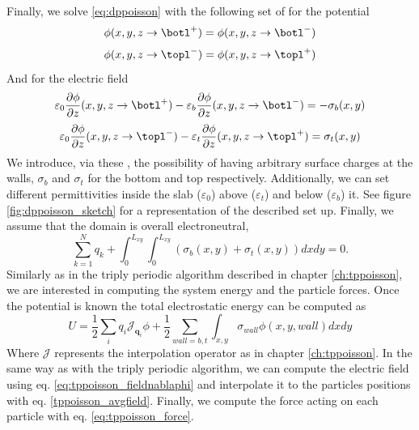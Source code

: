 \documentclass[ twoside,openright,titlepage,numbers=noenddot,%
headinclude,footinclude,cleardoublepage=empty,abstract=on,
BCOR=5mm,paper=a4,fontsize=11pt, dvipsnames
]{scrreprt}
\renewcommand{\vec}[1]{\bm{#1}}
\newcommand{\oper}[1]{\mathcal{#1}}
\begin{document}
Finally, we solve \eqref{eq:dppoisson} with the following set of \bcs for the potential
\begin{equation}\phi(x,y,z\rightarrow \botl^+)=\phi(x,y,z\rightarrow \botl^-)\label{eq:dppoissonbcs1}\end{equation}  
\begin{equation}\phi(x,y,z\rightarrow \topl^-)=\phi(x,y,z\rightarrow \topl^+)\label{eq:dppoissonbcs2}\end{equation}
And for the electric field 
\begin{equation}\varepsilon_0 \frac{\partial \phi}{\partial z}(x,y,z\rightarrow \botl^+)-\varepsilon_b \frac{\partial \phi}{\partial z}(x,y,z\rightarrow \botl^-)=-\sigma_b(x,y)\label{eq:dppoissonbcs3}\end{equation}  
\begin{equation}\varepsilon_0 \frac{\partial \phi}{\partial z}(x,y,z\rightarrow \topl^-)-\varepsilon_t \frac{\partial \phi}{\partial z}(x,y,z\rightarrow \topl^+)=\sigma_t(x,y)\label{eq:dppoissonbcs4}\end{equation} 
We introduce, via these \bcs, the possibility of having arbitrary surface charges at the walls, $\sigma_b$ and $\sigma_t$ for the bottom and top respectively. Additionally, we can set different permittivities inside the slab ($\varepsilon_0$) above ($\varepsilon_t$) and below ($\varepsilon_b$) it. See figure \ref{fig:dppoisson_sketch} for a representation of the described set up.
Finally, we assume that the domain is overall electroneutral,
\begin{equation}
  \label{eq:dppoisson_electroneutral}
  \sum_{k=1}^N{q_k} + \int_0^{L_{xy}}{\int_0^{L_{xy}}{(\sigma_b(x,y) + \sigma_t(x,y))dx dy}} = 0.
\end{equation}
Similarly as in the triply periodic algorithm described in chapter \ref{ch:tppoisson}, we are interested in computing the system energy and the particle forces.
Once the potential is known the total electrostatic energy can be computed as
\begin{equation}
  \label{eq:dppu}
  U = \frac{1}{2}\sum_i{q_i\oper{J}_{\vec{q}_i}\phi} + \frac{1}{2}\sum_{wall=b,t}{\int_{x,y}{\sigma_{wall}\phi(x,y,wall)dx dy}}
\end{equation}
Where $\oper{J}$ represents the interpolation operator as in chapter \ref{ch:tppoisson}.
In the same way as with the triply periodic algorithm, we can compute the electric field using eq. \eqref{eq:tppoisson_fieldnablaphi} and interpolate it to the particles positions with eq. \eqref{tppoisson_avgfield}. Finally, we compute the force acting on each particle with eq. \eqref{eq:tppoisson_force}.
\end{document}
